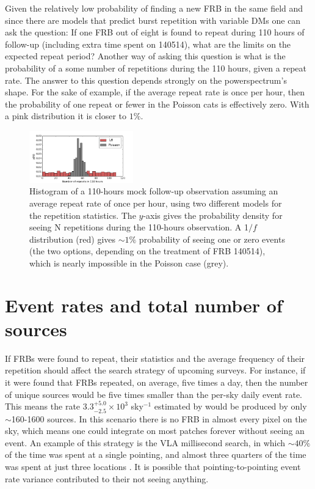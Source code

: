 \documentclass[useAMS,usenatbib]{mn2e}
\begin{document}
Given the relatively low probability of finding 
a new FRB in the same field and since there are models that predict
burst repetition with variable DMs \citep{2015arXiv150505535C, 2015arXiv150701002M}
one can ask the question: If one FRB out of eight is found to
repeat during 110 hours of follow-up (including extra time spent on 140514), 
what are the limits on the expected
repeat period? Another way of asking this question is what is the probability of 
a some number of repetitions during the 110 hours, given a repeat rate. The answer to 
this question depends strongly on the powerspectrum's shape. For the sake of example, if the average 
repeat rate is once per hour, then the probability of one repeat or fewer in the Poisson
cats is effectively zero. With a pink distribution it is closer to $1\%$. 


\begin{figure}
  \centering
   \includegraphics[trim={0in, 0in, 0in, 0in}, width=0.4\textwidth, height=0.23\textwidth]{110_hours_followup.png}
   \caption{Histogram of a 110-hours mock follow-up observation assuming an average repeat rate of 
   once per hour, using two different models 
   for the repetition statistics. The $y$-axis gives the probability density for seeing 
   N repetitions during the 110-hours observation.
   A 1$/f$ distribution (red) gives $\sim1\%$ probability of seeing one or zero events 
   (the two options, depending on the treatment of FRB 140514), 
   which is nearly impossible in the Poisson case (grey).}
   \label{FIG-hist}
\end{figure}


\section{Event rates and total number of sources}
\label{rate}

If FRBs were found to repeat, their statistics and the
average frequency of their repetition 
should affect the search strategy of upcoming surveys. 
For instance, if it were found that FRBs repeated,
on average, five times a day, then the number of unique 
sources would be five times smaller than the per-sky 
daily event rate. This means the rate 
$3.3^{+5.0}_{-2.5}\times10^3$ sky$^{-1}$ estimated by 
\cite{2015arXiv150500834R} would be produced by
only $\sim$160-1600 sources. In this scenario 
there is no FRB in almost every pixel on the sky, which means
one could integrate on most patches forever without 
seeing an event. An example of this strategy is the VLA millisecond search, 
in which $\sim40\%$ of the time was spent at a single pointing, and
almost three quarters of the time was spent at just three locations \citep{2015ApJ...807...16L}.
It is possible that pointing-to-pointing event rate variance contributed 
to their not seeing anything.
\end{document}
